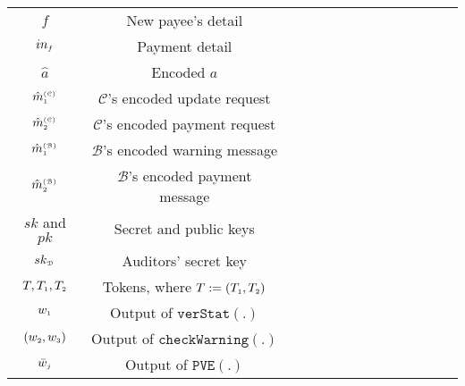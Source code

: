 \begin{table}[!htbp]
\begin{scriptsize}
\begin{center}
{{\begin{tabular}{|c|c|c|c|c|c|c|c|c|c|c|c|c|c|}
%               
\cellcolor{white!20}\scriptsize$f$ &\cellcolor{white!20}\scriptsize New payee’s detail  \\ 
\cellcolor{gray!20}\scriptsize$in_{\scriptscriptstyle f}$ &\cellcolor{gray!20}\scriptsize Payment detail \\ 
%
  \cellcolor{white!20}\scriptsize$\hat a$ &\cellcolor{white!20}\scriptsize Encoded $a$ \\     
%
\cellcolor{gray!20}\scriptsize$\hat {m}^{\scriptscriptstyle(\mathcal{C})}_{\scriptscriptstyle 1}$ &\cellcolor{gray!20}\scriptsize $\mathcal{C}$'s encoded update request\\     
%
\cellcolor{white!20}\scriptsize$\hat {m}^{\scriptscriptstyle(\mathcal{C})}_{\scriptscriptstyle 2}$ &\cellcolor{white!20}\scriptsize $\mathcal{C}$'s encoded payment request\\     
%      
\cellcolor{gray!20}\scriptsize$\hat {m}^{\scriptscriptstyle(\mathcal{B})}_{\scriptscriptstyle 1}$ &\cellcolor{gray!20}\scriptsize $\mathcal{B}$'s encoded warning message\\     
%
\cellcolor{white!20}\scriptsize$\hat {m}^{\scriptscriptstyle(\mathcal{B})}_{\scriptscriptstyle 2}$ &\cellcolor{white!20}\scriptsize $\mathcal{B}$'s encoded payment message\\     
%          
     \cellcolor{gray!20}\scriptsize$sk$ and $pk$ &\cellcolor{gray!20}\scriptsize Secret  and public keys\\     
%
   \cellcolor{white!20}\scriptsize$sk_{\scriptscriptstyle\mathcal{D}}$ &\cellcolor{white!20}\scriptsize Auditors' secret key\\     
%    
%
%
\cellcolor{gray!20}\scriptsize$T, T_{\scriptscriptstyle 1},T_{\scriptscriptstyle 2}$ &\cellcolor{gray!20}\scriptsize  Tokens, where  $T:=( T_{\scriptscriptstyle 1},T_{\scriptscriptstyle 2})$\\ 
%
\cellcolor{white!20}\scriptsize$w_{\scriptscriptstyle 1}$ &\cellcolor{white!20}\scriptsize  Output of $\mathtt{verStat}(.)$\\ 
%
\cellcolor{gray!20}\scriptsize$(w_{\scriptscriptstyle 2},w_{\scriptscriptstyle 3})$ &\cellcolor{gray!20}\scriptsize  Output of $\mathtt{checkWarning}(.)$\\ 
%
\cellcolor{white!20}\scriptsize$\bar{w}_{\scriptscriptstyle j}$ &\cellcolor{white!20}\scriptsize  Output of $\mathtt{PVE}(.)$\\ 

\end{tabular}}}
\end{center}
\end{scriptsize}
\end{table}
